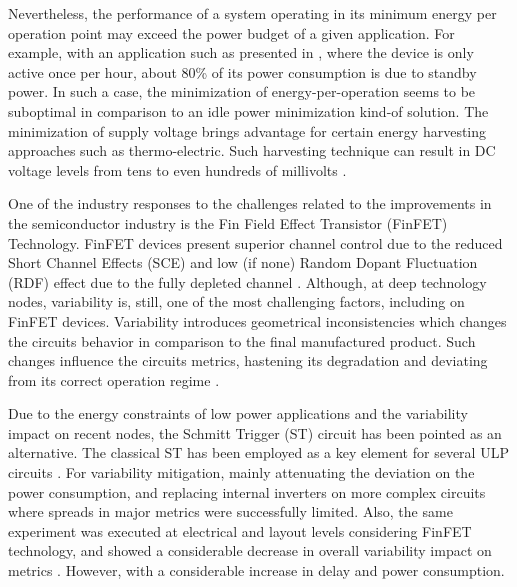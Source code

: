 \documentclass[diss,pgmicro,english]{iiufrgs}
\begin{document}
    Nevertheless, the performance of a system operating in its minimum energy per operation point may exceed the power budget of a given application. For example, with an application such as presented in \cite{fojtik2013millimeter}, where the device is only active once per hour, about 80\% of its power consumption is due to standby power. In such a case, the minimization of energy-per-operation seems to be suboptimal in comparison to an idle power minimization kind-of solution. The minimization of supply voltage brings advantage for certain energy harvesting approaches such as thermo-electric. Such harvesting technique can result in DC voltage levels from tens to even hundreds of millivolts \cite{khan2014flexible}.

    One of the industry responses to the challenges related to the improvements in the semiconductor industry is the Fin Field Effect Transistor (FinFET) Technology. FinFET devices present superior channel control due to the reduced Short Channel Effects (SCE) and low (if none) Random Dopant Fluctuation (RDF) effect due to the fully depleted channel \cite{farkhani2014comparative}. Although, at deep technology nodes, variability is, still, one of the most challenging factors, including on FinFET devices. Variability introduces geometrical inconsistencies which changes the circuits behavior in comparison to the final manufactured product. Such changes influence the circuits metrics, hastening its degradation and deviating from its correct operation regime \cite{abbas:15} \cite{nassif:08}.

    Due to the energy constraints of low power applications and the variability impact on recent nodes, the Schmitt Trigger (ST) circuit has been pointed as an alternative. The classical ST has been employed as a key element for several ULP circuits \cite{kulkarni2007160, 5746345, melek:17, lotze2017ultra}. For variability mitigation, mainly attenuating the deviation on the power consumption, and replacing internal inverters on more complex circuits \cite{dokania2015circuit} where spreads in major metrics were successfully limited. Also, the same experiment was executed at electrical and layout levels considering FinFET technology, and showed a considerable decrease in overall variability impact on metrics \cite{toledo2018pros,moraes2018evaluation}. However, with a considerable increase in delay and power consumption.

\end{document}
